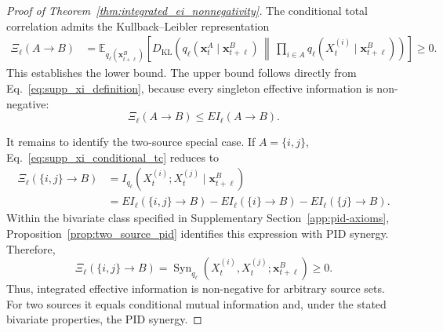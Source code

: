 \begin{proof}[Proof of Theorem~\ref{thm:integrated_ei_nonnegativity}]
The conditional total correlation admits the Kullback--Leibler
representation
\begin{align}
    \Xi_{\ell}(A\rightarrow B)
    &=
    \mathbb{E}_{
        q_{\ell}(\boldsymbol{x}_{t+\ell}^{B})
    }
    \left[
        D_{\mathrm{KL}}
        \left(
            q_{\ell}
            \left(
                \boldsymbol{x}_{t}^{A}
                \mid
                \boldsymbol{x}_{t+\ell}^{B}
            \right)
            \,\middle\|\,
            \prod_{i\in A}
            q_{\ell}
            \left(
                X_t^{(i)}
                \mid
                \boldsymbol{x}_{t+\ell}^{B}
            \right)
        \right)
    \right]
    \geq0.
    \label{eq:supp_xi_kl}
\end{align}
This establishes the lower bound. The upper bound follows directly from
Eq.~\eqref{eq:supp_xi_definition}, because every singleton effective
information is non-negative:
\begin{equation}
    \Xi_{\ell}(A\rightarrow B)
    \leq
    EI_{\ell}(A\rightarrow B).
    \label{eq:supp_xi_upper_bound}
\end{equation}

It remains to identify the two-source special case. If
\(A=\{i,j\}\), Eq.~\eqref{eq:supp_xi_conditional_tc} reduces to
\begin{align}
    \Xi_{\ell}(\{i,j\}\rightarrow B)
    &=
    I_{q_{\ell}}
    \left(
        X_t^{(i)};
        X_t^{(j)}
        \mid
        \boldsymbol{x}_{t+\ell}^{B}
    \right)
    \nonumber\\
    &=
    EI_{\ell}(\{i,j\}\rightarrow B)
    -
    EI_{\ell}(\{i\}\rightarrow B)
    -
    EI_{\ell}(\{j\}\rightarrow B).
    \label{eq:supp_two_source_xi}
\end{align}
Within the bivariate class specified in Supplementary Section~\ref{app:pid-axioms}, Proposition~\ref{prop:two_source_pid} identifies this expression with PID synergy. Therefore,
\begin{equation}
    \Xi_{\ell}(\{i,j\}\rightarrow B)
    =
    \operatorname{Syn}_{q_{\ell}}
    \left(
        X_t^{(i)},X_t^{(j)};
        \boldsymbol{x}_{t+\ell}^{B}
    \right)
    \geq0.
    \label{eq:supp_xi_equals_synergy}
\end{equation}
Thus, integrated effective information is non-negative for arbitrary source sets. For two sources it equals conditional mutual information and, under the stated bivariate properties, the PID synergy.
\end{proof}

